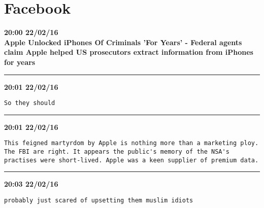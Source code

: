 \section{Facebook}
\label{threads:facebook}

\begin{adjustwidth}{0cm}{0cm}
\footnotesize \textbf{20:00 22/02/16}\\
\large \textbf{Apple Unlocked iPhones Of Criminals 'For Years' - Federal agents claim Apple helped US prosecutors extract information from iPhones for years}
\end{adjustwidth}

\hrule%

\begin{adjustwidth}{0cm}{0cm}
\footnotesize \textbf{20:01 22/02/16}

\begin{lstlisting}[breaklines, breakatwhitespace, basicstyle=\small, frame=leftline]
So they should
\end{lstlisting}
\end{adjustwidth}

\hrule%

\begin{adjustwidth}{0cm}{0cm}
\footnotesize \textbf{20:01 22/02/16}

\begin{lstlisting}[breaklines, breakatwhitespace, basicstyle=\small, frame=leftline]
This feigned martyrdom by Apple is nothing more than a marketing ploy. The FBI are right. It appears the public's memory of the NSA's practises were short-lived. Apple was a keen supplier of premium data.
\end{lstlisting}
\end{adjustwidth}

\hrule%

\begin{adjustwidth}{0cm}{0cm}
\footnotesize \textbf{20:03 22/02/16}

\begin{lstlisting}[breaklines, breakatwhitespace, basicstyle=\small, frame=leftline]
probably just scared of upsetting them muslim idiots
\end{lstlisting}
\end{adjustwidth}

